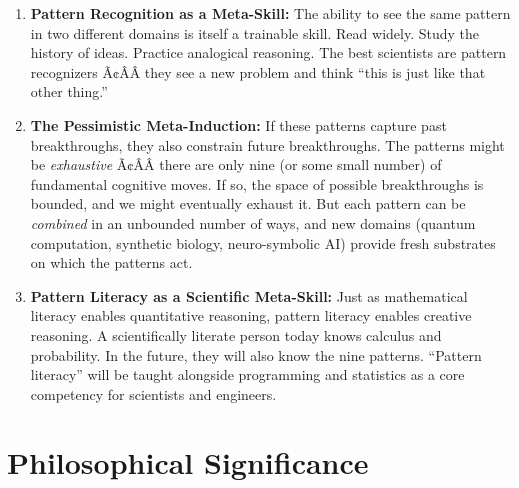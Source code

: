 \begin{enumerate}
\item \textbf{Pattern Recognition as a Meta-Skill:} The ability to see the same pattern in two different domains is itself a trainable skill. Read widely. Study the history of ideas. Practice analogical reasoning. The best scientists are pattern recognizers Ã¢ÂÂ they see a new problem and think ``this is just like that other thing.''

\item \textbf{The Pessimistic Meta-Induction:} If these patterns capture past breakthroughs, they also constrain future breakthroughs. The patterns might be \emph{exhaustive} Ã¢ÂÂ there are only nine (or some small number) of fundamental cognitive moves. If so, the space of possible breakthroughs is bounded, and we might eventually exhaust it. But each pattern can be \emph{combined} in an unbounded number of ways, and new domains (quantum computation, synthetic biology, neuro-symbolic AI) provide fresh substrates on which the patterns act.

\item \textbf{Pattern Literacy as a Scientific Meta-Skill:} Just as mathematical literacy enables quantitative reasoning, pattern literacy enables creative reasoning. A scientifically literate person today knows calculus and probability. In the future, they will also know the nine patterns. ``Pattern literacy'' will be taught alongside programming and statistics as a core competency for scientists and engineers.
\end{enumerate}

\section{Philosophical Significance}
\label{sec:anatomy:philosophy}

